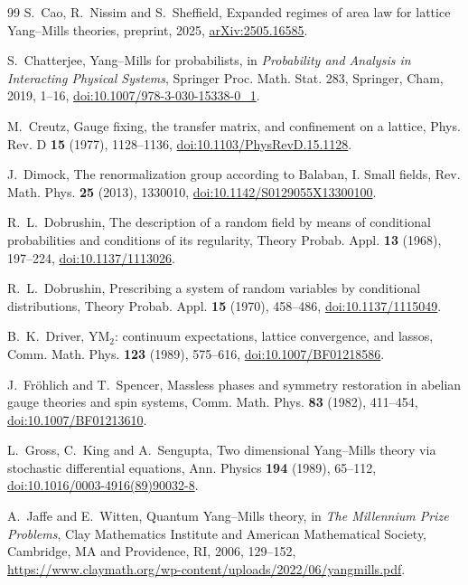 \documentclass[11pt]{amsart}
\theoremstyle{definition}
\theoremstyle{remark}
\numberwithin{equation}{section}
\begin{document}
\begin{thebibliography}{99}
S.~Cao, R.~Nissim and S.~Sheffield, Expanded regimes of area law for lattice Yang--Mills theories, preprint, 2025, \href{https://arxiv.org/abs/2505.16585}{arXiv:2505.16585}.

S.~Chatterjee, Yang--Mills for probabilists, in \emph{Probability and Analysis in Interacting Physical Systems}, Springer Proc. Math. Stat. 283, Springer, Cham, 2019, 1--16, \href{https://doi.org/10.1007/978-3-030-15338-0_1}{doi:10.1007/978-3-030-15338-0\_1}.

M.~Creutz, Gauge fixing, the transfer matrix, and confinement on a lattice,
Phys. Rev. D \textbf{15} (1977), 1128--1136,
\href{https://doi.org/10.1103/PhysRevD.15.1128}{doi:10.1103/PhysRevD.15.1128}.

J.~Dimock, The renormalization group according to Balaban, I. Small fields, Rev. Math. Phys. \textbf{25} (2013), 1330010, \href{https://doi.org/10.1142/S0129055X13300100}{doi:10.1142/S0129055X13300100}.

R.~L.~Dobrushin, The description of a random field by means of conditional
probabilities and conditions of its regularity, Theory Probab. Appl.
\textbf{13} (1968), 197--224,
\href{https://doi.org/10.1137/1113026}{doi:10.1137/1113026}.

R.~L.~Dobrushin, Prescribing a system of random variables by conditional
distributions, Theory Probab. Appl. \textbf{15} (1970), 458--486,
\href{https://doi.org/10.1137/1115049}{doi:10.1137/1115049}.

B.~K.~Driver, YM$_2$: continuum expectations, lattice convergence, and lassos, Comm. Math. Phys. \textbf{123} (1989), 575--616, \href{https://doi.org/10.1007/BF01218586}{doi:10.1007/BF01218586}.

J.~Fr\"ohlich and T.~Spencer, Massless phases and symmetry restoration in abelian gauge theories and spin systems, Comm. Math. Phys. \textbf{83} (1982), 411--454, \href{https://doi.org/10.1007/BF01213610}{doi:10.1007/BF01213610}.

L.~Gross, C.~King and A.~Sengupta, Two dimensional Yang--Mills theory via stochastic differential equations, Ann. Physics \textbf{194} (1989), 65--112, \href{https://doi.org/10.1016/0003-4916(89)90032-8}{doi:10.1016/0003-4916(89)90032-8}.

A.~Jaffe and E.~Witten, Quantum Yang--Mills theory, in \emph{The Millennium
Prize Problems}, Clay Mathematics Institute and American Mathematical
Society, Cambridge, MA and Providence, RI, 2006, 129--152,
\url{https://www.claymath.org/wp-content/uploads/2022/06/yangmills.pdf}.


\end{thebibliography}
\end{document}
